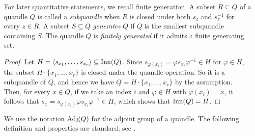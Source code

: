 

For later quantitative statements, we recall finite generation. A subset $R\subseteq Q$ of a quandle $Q$ is called a \emph{subquandle} when $R$ is closed under both $s_z$ and $s_z^{-1}$ for every $z\in R$. A subset $S\subseteq Q$ \emph{generates} $Q$ if $Q$ is the smallest subquandle containing $S$. The quandle $Q$ is \emph{finitely generated} if it admits a finite generating set.


\begin{proof}
Let $H=\langle s_{x_1},\ldots,s_{x_r}\rangle \subseteq \operatorname{Inn}(Q)$. Since $s_{\varphi(x_i)}=\varphi s_{x_i}\varphi^{-1}\in H$ for $\varphi\in H$, the subset $H\cdot\{x_1,\ldots,x_r\}$ is closed under the quandle operation. So it is a subquandle of $Q$, and hence we have $Q=H\cdot\{x_1,\ldots,x_r\}$ by the assumption. Then, for every $x\in Q$, if we take an index $i$ and $\varphi\in H$ with $\varphi(x_i)=x$, it follows that $s_x=s_{\varphi(x_i)} \varphi s_{x_i} \varphi^{-1}\in H$, which shows that $\operatorname{Inn}(Q)=H$.
\end{proof}


We use the notation $\operatorname{Adj}(Q)$ for the adjoint group of a quandle. The following definition and properties are standard; see \cite[Sections~2 and 5]
{eisermann_2014_quandle_coverings_and_their_galois_correspondence}.

